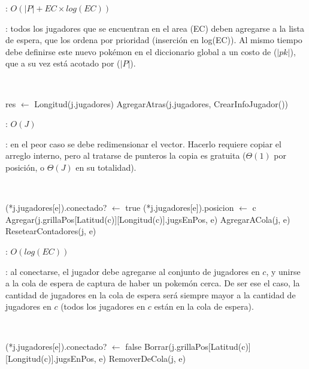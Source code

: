 \begin{Algoritmos}
	\complejidad: $O(|P| + EC \times log(EC))$

	\justifcomp: todos los jugadores que se encuentran en el area (EC) deben agregarse a la lista de espera, que los ordena por prioridad (inserción en log(EC)). Al mismo tiempo debe definirse este nuevo pokémon en el diccionario global a un costo de ($|pk|$), que a su vez está acotado por ($|P|$).

	~

	\begin{algorithm}[H]
		\NoCaptionOfAlgo
		\caption{}
		res $\leftarrow$ Longitud(j.jugadores)
		AgregarAtras(j.jugadores, CrearInfoJugador())
	\end{algorithm}

	\complejidad: $O(J)$

	\justifcomp: en el peor caso se debe redimensionar el vector. Hacerlo requiere copiar el arreglo interno, pero al tratarse de punteros la copia es gratuita ($\Theta(1)$ por posición, o $\Theta(J)$ en su totalidad).

	~

	\begin{algorithm}[H]
		\NoCaptionOfAlgo
		\caption{}
		(*j.jugadores[e]).conectado? $\leftarrow$ true
		(*j.jugadores[e]).posicion $\leftarrow$ c
		Agregar(j.grillaPos[Latitud(c)][Longitud(c)].jugsEnPos, e)
		AgregarACola(j, e)
		ResetearContadores(j, e)
	\end{algorithm}

	\complejidad: $O(log(EC))$

	\justifcomp: al conectarse, el jugador debe agregarse al conjunto de jugadores en $c$, y unirse a la cola de espera de captura de haber un pokemón cerca. De ser ese el caso, la cantidad de jugadores en la cola de espera será siempre mayor a la cantidad de jugadores en $c$ (todos los jugadores en $c$ están en la cola de espera).

	~

	\begin{algorithm}[H]
		\NoCaptionOfAlgo
		\caption{}
		(*j.jugadores[e]).conectado? $\leftarrow$ false
		Borrar(j.grillaPos[Latitud(c)][Longitud(c)].jugsEnPos, e)
		RemoverDeCola(j, e)
	\end{algorithm}


\end{Algoritmos}
